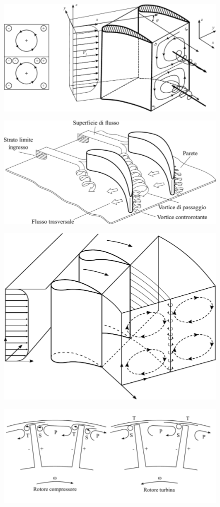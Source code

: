 \begin{figure}[h!]
\centering
  \includegraphics[width=.7\textwidth]{fig/VortPass.pdf}
\caption{}
\label{fig:VortPass}
\end{figure}

\begin{figure}[h!]
\centering
  \includegraphics[width=.7\textwidth]{fig/VortFerrCav.pdf}
\caption{}
\label{fd:VortFerrCav}
\end{figure}
\begin{figure}[h!]
\centering
  \includegraphics[width=.6\textwidth]{fig/VortVall.pdf}
\caption{}
\label{fd:VortVall}
\end{figure}
\begin{figure}[h!]
\centering
  \includegraphics[width=.8\textwidth]{fig/VortTraf.pdf}
\caption{}
\label{fd:VortTraf}
\end{figure}
